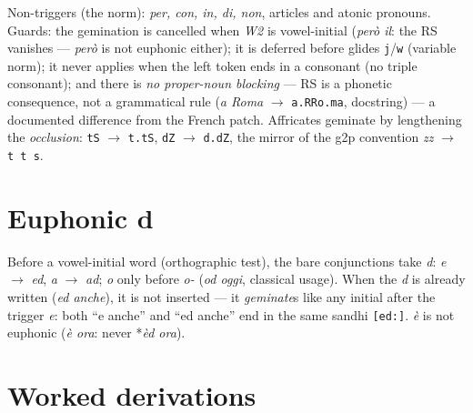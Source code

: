 \documentclass[11pt,a4paper]{report}
\newcommand{\smp}[1]{\texttt{#1}}          %
\begin{document}
\noindent Non-triggers (the norm): \emph{per, con, in, di, non}, articles
and atonic pronouns. Guards: the gemination is cancelled when \emph{W2} is
vowel-initial (\emph{per\`o il}: the RS vanishes — \emph{per\`o} is not
euphonic either); it is deferred before glides \smp{j}/\smp{w} (variable
norm); it never applies when the left token ends in a consonant (no triple
consonant); and there is \emph{no proper-noun blocking} — RS is a phonetic
consequence, not a grammatical rule (\emph{a Roma} $\rightarrow$
\smp{a.RRo.ma}, docstring) — a documented difference from the French patch.
Affricates geminate by lengthening the \emph{occlusion}:
\smp{tS} $\rightarrow$ \smp{t.tS}, \smp{dZ} $\rightarrow$ \smp{d.dZ}, the
mirror of the g2p convention \emph{zz} $\rightarrow$ \smp{t t s}.

\section{Euphonic d}

Before a vowel-initial word (orthographic test), the bare conjunctions take
\emph{d}: \emph{e} $\rightarrow$ \emph{ed}, \emph{a} $\rightarrow$
\emph{ad}; \emph{o} only before \emph{o-} (\emph{od oggi}, classical usage).
When the \emph{d} is already written (\emph{ed anche}), it is not inserted —
it \emph{geminate}s like any initial after the trigger \emph{e}: both ``e
anche'' and ``ed anche'' end in the same sandhi \smp{[ed:]}. \emph{\`e} is
not euphonic (\emph{\`e ora}: never *\emph{\`ed ora}).

\section{Worked derivations}
\end{document}
